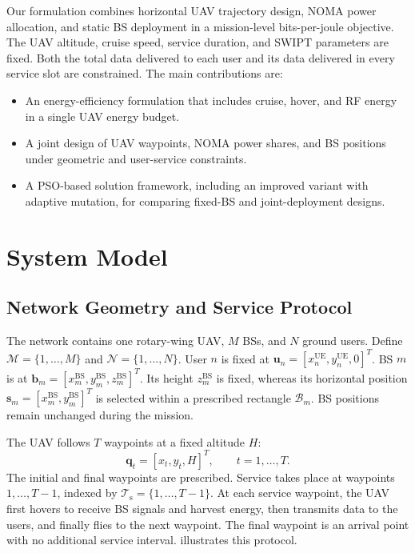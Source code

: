 \documentclass[conference]{IEEEtran}
\newcommand{\UE}{\mathrm{UE}}
\newcommand{\BS}{\mathrm{BS}}
\newcommand{\setT}{\mathcal{T}_{\mathrm{s}}}
\newcommand{\setN}{\mathcal{N}}
\newcommand{\setM}{\mathcal{M}}
\begin{document}
Our formulation combines horizontal UAV trajectory design, NOMA power allocation, and static BS deployment in a mission-level bits-per-joule objective. The UAV altitude, cruise speed, service duration, and SWIPT parameters are fixed. Both the total data delivered to each user and its data delivered in every service slot are constrained. The main contributions are:
\begin{itemize}
\item An energy-efficiency formulation that includes cruise, hover, and RF energy in a single UAV energy budget.
\item A joint design of UAV waypoints, NOMA power shares, and BS positions under geometric and user-service constraints.
\item A PSO-based solution framework, including an improved variant with adaptive mutation, for comparing fixed-BS and joint-deployment designs.
\end{itemize}

\section{System Model}
\label{sec:system_model}
\subsection{Network Geometry and Service Protocol}
The network contains one rotary-wing UAV, $M$ BSs, and $N$ ground users. Define $\setM=\{1,\ldots,M\}$ and $\setN=\{1,\ldots,N\}$. User $n$ is fixed at $\bm u_n=[x_n^{\UE},y_n^{\UE},0]^T$. BS $m$ is at $\bm b_m=[x_m^{\BS},y_m^{\BS},z_m^{\BS}]^T$. Its height $z_m^{\BS}$ is fixed, whereas its horizontal position $\bm s_m=[x_m^{\BS},y_m^{\BS}]^T$ is selected within a prescribed rectangle $\mathcal B_m$. BS positions remain unchanged during the mission.

The UAV follows $T$ waypoints at a fixed altitude $H$:
\begin{equation}
\bm q_t=[x_t,y_t,H]^T,\qquad t=1,\ldots,T.
\label{eq:waypoints}
\end{equation}
The initial and final waypoints are prescribed. Service takes place at waypoints $1,\ldots,T-1$, indexed by $\setT=\{1,\ldots,T-1\}$. At each service waypoint, the UAV first hovers to receive BS signals and harvest energy, then transmits data to the users, and finally flies to the next waypoint. The final waypoint is an arrival point with no additional service interval.  illustrates this protocol.
\end{document}
